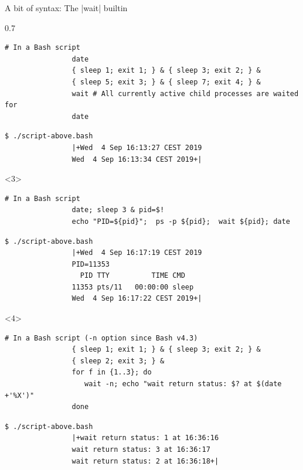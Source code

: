 \begin{frame}[fragile]{A bit of syntax: The \bash|wait| builtin}
\begin{overlayarea}{\textwidth}{0.7\textheight}
\begin{onlyenv}
            \begin{lstlisting}[style=MyBash, numbers=none, aboveskip=3mm]
                # In a Bash script
                date
                { sleep 1; exit 1; } & { sleep 3; exit 2; } &
                { sleep 5; exit 3; } & { sleep 7; exit 4; } &
                wait # All currently active child processes are waited for
                date
            \end{lstlisting}
            \begin{lstlisting}[style=MyBash, numbers=none, aboveskip=1mm]
                $ ./script-above.bash
                |+Wed  4 Sep 16:13:27 CEST 2019
                Wed  4 Sep 16:13:34 CEST 2019+|
            \end{lstlisting}
        \end{onlyenv}
        \begin{onlyenv}<3>
            \begin{lstlisting}[style=MyBash, numbers=none, aboveskip=3mm]
                # In a Bash script
                date; sleep 3 & pid=$!
                echo "PID=${pid}";  ps -p ${pid};  wait ${pid}; date
            \end{lstlisting}
            \begin{lstlisting}[style=MyBash, numbers=none, aboveskip=1mm]
                $ ./script-above.bash
                |+Wed  4 Sep 16:17:19 CEST 2019
                PID=11353
                  PID TTY          TIME CMD
                11353 pts/11   00:00:00 sleep
                Wed  4 Sep 16:17:22 CEST 2019+|
            \end{lstlisting}
        \end{onlyenv}
        \begin{onlyenv}<4>
            \begin{lstlisting}[style=MyBash, numbers=none, aboveskip=3mm]
                # In a Bash script (-n option since Bash v4.3)
                { sleep 1; exit 1; } & { sleep 3; exit 2; } &
                { sleep 2; exit 3; } &
                for f in {1..3}; do
                   wait -n; echo "wait return status: $? at $(date +'%X')"
                done
            \end{lstlisting}
            \begin{lstlisting}[style=MyBash, numbers=none, aboveskip=1mm]
                $ ./script-above.bash
                |+wait return status: 1 at 16:36:16
                wait return status: 3 at 16:36:17
                wait return status: 2 at 16:36:18+|
            \end{lstlisting}

\end{onlyenv}
\end{overlayarea}
\end{frame}
